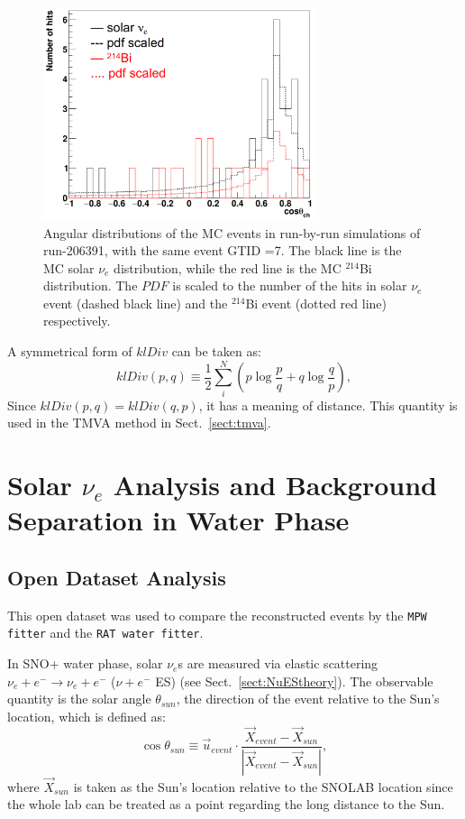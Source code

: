\begin{figure}[!htb]
	\centering
	\includegraphics[width=8cm]{klDiv_example.png}
	\caption[Angular distributions of the MC events in run-by-run simulations.]{Angular distributions of the MC events in run-by-run simulations of run-206391, with the same event GTID =7. The black line is the MC solar $\nu_e$ distribution, while the red line is the MC $^{214}$Bi distribution. The $PDF$ is scaled to the number of the hits in solar $\nu_e$ event (dashed black line) and the $^{214}$Bi event (dotted red line) respectively.}
	\label{kLdiv_example}
\end{figure}

A symmetrical form of $klDiv$ can be taken as:
\begin{equation}\label{eq:symKlDiv}
klDiv(p,q) \equiv \frac{1}{2}\sum_{i}^N (p\log{\frac{p}{q}}+q\log{\frac{q}{p}}),
\end{equation}
Since $klDiv(p,q)=klDiv(q,p)$, it has a meaning of distance. This quantity is used in the TMVA method in Sect.~\ref{sect:tmva}.

\section{Solar \texorpdfstring{$\nu_e$}{Lg} Analysis and Background Separation in Water Phase}
\subsection{Open Dataset Analysis}
This open dataset was used to compare the reconstructed events by the \texttt{MPW fitter} and the \texttt{RAT water fitter}.

In SNO+ water phase, solar $\nu_e$s are measured via elastic scattering $\nu_e+e^-\to \nu_e+e^-$ ($\nu+e^-$ ES) (see Sect.~\ref{sect:NuEStheory}). The observable quantity is the solar angle $\theta_{sun}$, the direction of the event relative to the Sun's location, which is defined as:
\begin{equation}
\cos\theta_{sun}\equiv \vec u_{event}\cdot \frac{\vec{X}_{event}-\vec{X}_{sun}}{|\vec{X}_{event}-\vec{X}_{sun}|},
\end{equation}
where $\vec{X}_{sun}$ is taken as the Sun's location relative to the SNOLAB location since the whole lab can be treated as a point regarding the long distance to the Sun. 

